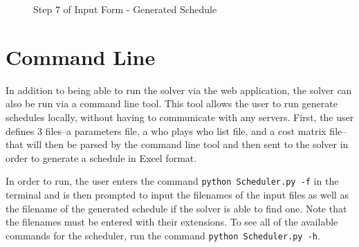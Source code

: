 \documentclass[book]{hmcclinic}
\begin{document}
\begin{figure}[h]
    \centering
    \caption{Step 7 of Input Form - Generated Schedule}
\end{figure}



\section{Command Line}
In addition to being able to run the solver via the web application, the solver can also be run via a command line tool. This tool allows the user to run generate schedules locally, without having to communicate with any servers. First, the user defines 3 files--a parameters file, a who plays who list file, and a cost matrix file--that will then be parsed by the command line tool and then sent to the solver in order to generate a schedule in Excel format.  

In order to run, the user enters the command \verb|python Scheduler.py -f| in the terminal and is then prompted to input the filenames of the input files as well as the filename of the generated schedule if the solver is able to find one. Note that the filenames must be entered with their extensions. To see all of the available commands for the scheduler, run the command \verb|python Scheduler.py -h|.
\end{document}
